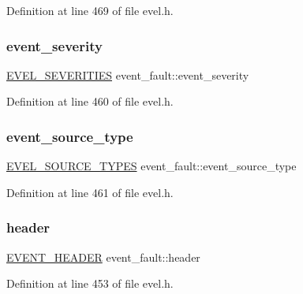 Definition at line 469 of file evel.\+h.

\hypertarget{structevent__fault_a0a8f81faa5b9c58bc826f308d472f696}{}\label{structevent__fault_a0a8f81faa5b9c58bc826f308d472f696} 
\subsubsection{\texorpdfstring{event\+\_\+severity}{event\_severity}}
{\footnotesize\ttfamily \hyperlink{evel_8h_ad28dcc9cce27ecb7e4c9020107a6db9c}{E\+V\+E\+L\+\_\+\+S\+E\+V\+E\+R\+I\+T\+I\+ES} event\+\_\+fault\+::event\+\_\+severity}



Definition at line 460 of file evel.\+h.

\hypertarget{structevent__fault_ae724b6a8c8056d11fae378da50063577}{}\label{structevent__fault_ae724b6a8c8056d11fae378da50063577} 
\subsubsection{\texorpdfstring{event\+\_\+source\+\_\+type}{event\_source\_type}}
{\footnotesize\ttfamily \hyperlink{evel_8h_a304eae0d024005dc4c7031bdd774d64a}{E\+V\+E\+L\+\_\+\+S\+O\+U\+R\+C\+E\+\_\+\+T\+Y\+P\+ES} event\+\_\+fault\+::event\+\_\+source\+\_\+type}



Definition at line 461 of file evel.\+h.

\hypertarget{structevent__fault_a4d189397d39b197f2c6e2527be76b5f9}{}\label{structevent__fault_a4d189397d39b197f2c6e2527be76b5f9} 
\subsubsection{\texorpdfstring{header}{header}}
{\footnotesize\ttfamily \hyperlink{evel_8h_aa0ea94c675729365ea7825c4fc7e06d8}{E\+V\+E\+N\+T\+\_\+\+H\+E\+A\+D\+ER} event\+\_\+fault\+::header}



Definition at line 453 of file evel.\+h.


